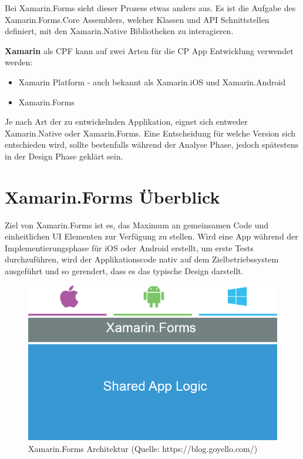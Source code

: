 	Bei Xamarin.Forms sieht dieser Prozess etwas anders aus. Es ist die Aufgabe des Xamarin.Forms.Core Assemblers, welcher Klassen und API Schnittstellen definiert, mit den Xamarin.Native Bibliotheken zu interagieren.

	\textbf{Xamarin} als CPF kann auf zwei Arten für die CP App Entwicklung verwendet werden:
	\begin{itemize}
		\setlength\itemsep{0em}
		\item Xamarin Platform - auch bekannt als Xamarin.iOS und Xamarin.Android
		\item Xamarin.Forms
	\end{itemize}
	Je nach Art der zu entwickelnden Applikation, eignet sich entweder Xamarin.Native oder Xamarin.Forms. Eine Entscheidung für welche Version sich entschieden wird, sollte bestenfalls während der Analyse Phase, jedoch spätestens in der Design Phase geklärt sein.

\section{Xamarin.Forms Überblick}
\label{sec:xamrinformsoverview}

	Ziel von Xamarin.Forms ist es, das Maximum an gemeinsamen Code und einheitlichen UI Elementen zur Verfügung zu stellen. Wird eine App während der Implementierungsphase für iOS oder Android erstellt, um erste Tests durchzuführen, wird der Applikationscode nativ auf dem Zielbetriebssystem ausgeführt \cite{book:Xamarin.Forms-Essentials:} und so gerendert, dass es das typische Design darstellt.

	\begin{figure}[h!]
		\centering
		\includegraphics[width=1\textwidth]{images/code-sharing2.png}
		\caption{Xamarin.Forms Architektur (Quelle: https://blog.goyello.com/)}
		\label{fig:xamarinarchitectur}
	\end{figure}

